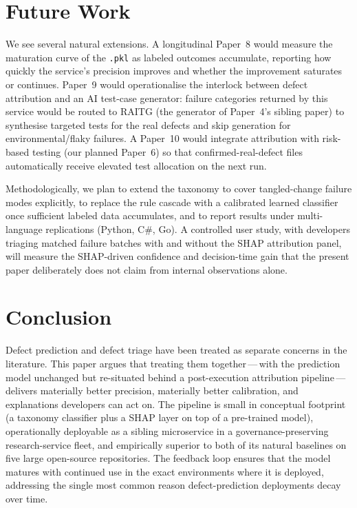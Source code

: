 \documentclass[conference]{IEEEtran}
\begin{document}
\section{Future Work}
\label{sec:future_work}

We see several natural extensions. A longitudinal Paper~8 would measure the maturation curve of the \texttt{.pkl} as labeled outcomes accumulate, reporting how quickly the service's precision improves and whether the improvement saturates or continues. Paper~9 would operationalise the interlock between defect attribution and an AI test-case generator: failure categories returned by this service would be routed to RAITG (the generator of Paper~4's sibling paper) to synthesise targeted tests for the real defects and skip generation for environmental/flaky failures. A Paper~10 would integrate attribution with risk-based testing (our planned Paper~6) so that confirmed-real-defect files automatically receive elevated test allocation on the next run.

Methodologically, we plan to extend the taxonomy to cover tangled-change failure modes explicitly, to replace the rule cascade with a calibrated learned classifier once sufficient labeled data accumulates, and to report results under multi-language replications (Python, C\#, Go). A controlled user study, with developers triaging matched failure batches with and without the SHAP attribution panel, will measure the SHAP-driven confidence and decision-time gain that the present paper deliberately does not claim from internal observations alone.

\section{Conclusion}
\label{sec:conclusion}

Defect prediction and defect triage have been treated as separate concerns in the literature. This paper argues that treating them together\,---\,with the prediction model unchanged but re-situated behind a post-execution attribution pipeline\,---\,delivers materially better precision, materially better calibration, and explanations developers can act on. The pipeline is small in conceptual footprint (a taxonomy classifier plus a SHAP layer on top of a pre-trained model), operationally deployable as a sibling microservice in a governance-preserving research-service fleet, and empirically superior to both of its natural baselines on five large open-source repositories. The feedback loop ensures that the model matures with continued use in the exact environments where it is deployed, addressing the single most common reason defect-prediction deployments decay over time.
\end{document}
